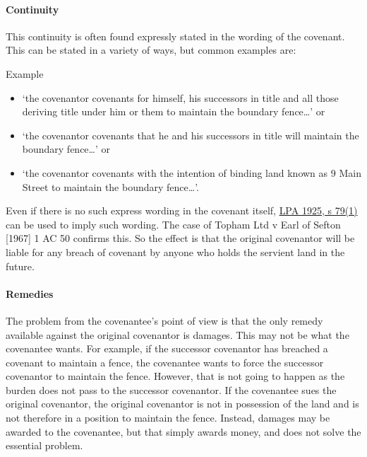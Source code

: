 \documentclass[
]{article}
\providecommand{\tightlist}{%
  \setlength{\itemsep}{0pt}\setlength{\parskip}{0pt}}
\begin{document}
\hypertarget{continuity}{%
\paragraph{Continuity}\label{continuity}}

This continuity is often found expressly stated in the wording of the
covenant. This can be stated in a variety of ways, but common examples
are:

Example

\begin{itemize}
\tightlist
\item
  `the covenantor covenants for himself, his successors in title and all
  those deriving title under him or them to maintain the boundary
  fence\ldots' or
\item
  `the covenantor covenants that he and his successors in title will
  maintain the boundary fence\ldots' or
\item
  `the covenantor covenants with the intention of binding land known as
  9 Main Street to maintain the boundary fence\ldots'.
\end{itemize}

Even if there is no such express wording in the covenant itself,
\href{https://www.legislation.gov.uk/ukpga/Geo5/15-16/20/section/79}{LPA
1925, s 79(1)} can be used to imply such wording. The case of Topham Ltd
v Earl of Sefton {[}1967{]} 1 AC 50 confirms this. So the effect is that
the original covenantor will be liable for any breach of covenant by
anyone who holds the servient land in the future.

\hypertarget{remedies}{%
\paragraph{Remedies}\label{remedies}}

The problem from the covenantee's point of view is that the only remedy
available against the original covenantor is damages. This may not be
what the covenantee wants. For example, if the successor covenantor has
breached a covenant to maintain a fence, the covenantee wants to force
the successor covenantor to maintain the fence. However, that is not
going to happen as the burden does not pass to the successor covenantor.
If the covenantee sues the original covenantor, the original covenantor
is not in possession of the land and is not therefore in a position to
maintain the fence. Instead, damages may be awarded to the covenantee,
but that simply awards money, and does not solve the essential problem.
\end{document}

